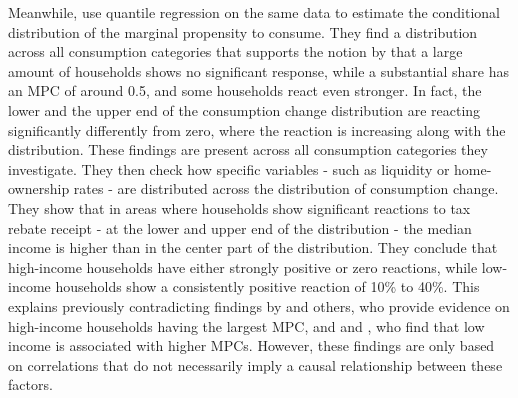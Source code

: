 Meanwhile, \cite{misrasurico_2014} use quantile regression on the same data to estimate the conditional distribution of the marginal propensity to consume. They find a distribution across all consumption categories that supports the notion by \cite{kaplanviolante_2014} that a large amount of households shows no significant response, while a substantial share has an MPC of around 0.5, and some households react even stronger. In fact, the lower and the upper end of the consumption change distribution are reacting significantly differently from zero, where the reaction is increasing along with the distribution. These findings are present across all consumption categories they investigate. They then check how specific variables - such as liquidity or home-ownership rates - are distributed across the distribution of consumption change. They show that in areas where households show significant reactions to tax rebate receipt - at the lower and upper end of the distribution - the median income is higher than in the center part of the distribution. They conclude that high-income households have either strongly positive or zero reactions, while low-income households show a consistently positive reaction of 10\% to 40\%. This explains previously contradicting findings by \cite{sahmetal_2010} and others, who provide evidence on high-income households having the largest MPC, and \cite{jps_2006} and \cite{parkeretal_2013}, who find that low income is associated with higher MPCs. However, these findings are only based on correlations that do not necessarily imply a causal relationship between these factors. \\ 

